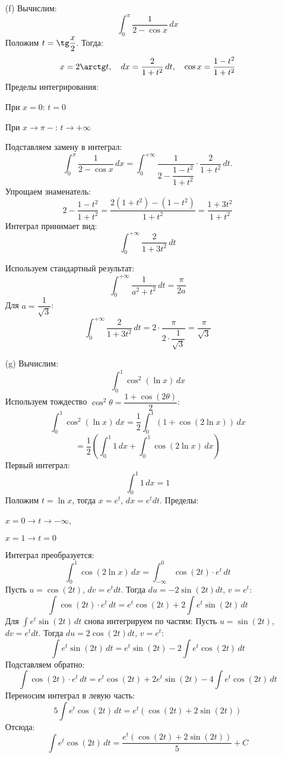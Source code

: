 \documentclass[a4paper]{article}
\begin{document}
\begin{enumerate}
\begin{enumerate}
    \item[(f)]Вычислим:
    \[
    \int_{0}^{\pi} \frac{1}{2 - \cos x} \, dx
    \]  
    Положим \(t = \tg \dfrac{x}{2}\). Тогда:  
    \[
    x = 2 \arctg t, \quad dx = \dfrac{2}{1 + t^2} \, dt,
     \quad \cos x = \dfrac{1 - t^2}{1 + t^2}
    \]  
    Пределы интегрирования:  
    
    При \(x = 0\): \(t = 0\) 
    
    При \(x \to \pi-\): \(t \to +\infty\)

    Подставляем замену в интеграл:  
    \[
    \int_{0}^{\pi} \frac{1}{2 - \cos x} \, dx = \int_{0}^{+\infty} \frac{1}{2 - \dfrac{1 - t^2}{1 + t^2}} \cdot \dfrac{2}{1 + t^2} \, dt.
    \]  
    Упрощаем знаменатель:  
    \[
    2 - \dfrac{1 - t^2}{1 + t^2} = \dfrac{2(1 + t^2) - (1 - t^2)}{1 + t^2} =
     \dfrac{1 + 3t^2}{1 + t^2}
    \]  
    Интеграл принимает вид:  
    \[
    \int_{0}^{+\infty} \dfrac{2}{1 + 3t^2} \, dt
    \]
    
    Используем стандартный результат:  
    \[
    \int_{0}^{+\infty} \dfrac{1}{a^2 + t^2} \, dt = \dfrac{\pi}{2a}
    \]  
    Для \(a = \dfrac{1}{\sqrt{3}}\):  
    \[
    \int_{0}^{+\infty} \dfrac{2}{1 + 3t^2} \, dt = 2 \cdot 
    \dfrac{\pi}{2 \cdot \dfrac{1}{\sqrt{3}}} = \dfrac{\pi}{\sqrt{3}}
    \]

    \item[(g)]Вычислим:
    \[
    \int_{0}^{1} \cos^2(\ln x) \, dx
    \] 
    Используем тождество \(\cos^2 \theta = \dfrac{1 + \cos(2\theta)}{2}\):  
    \[
    \int_{0}^{1} \cos^2(\ln x) \, dx = \dfrac{1}{2} \int_{0}^{1} 
    \left(1 + \cos(2\ln x)\right) \, dx
    \]
    \[
    = \dfrac{1}{2} \left( \int_{0}^{1} 1 \, dx + \int_{0}^{1} \cos(2\ln x) \, dx \right)
    \]
    Первый интеграл:  
    \[
    \int_{0}^{1} 1 \, dx = 1
    \]
    Положим \(t = \ln x\), тогда \(x = e^t\), \(dx = e^t dt\). Пределы:  
    
    \(x = 0 \to t \to -\infty\),  
  
    \(x = 1 \to t = 0\)
    
    Интеграл преобразуется:  
    \[
    \int_{0}^{1} \cos(2\ln x) \, dx = \int_{-\infty}^{0} \cos(2t) \cdot e^t \, dt
    \]
    Пусть \(u = \cos(2t)\), \(dv = e^t dt\). Тогда \(du = -2\sin(2t) dt\), \(v = e^t\):  
    \[
    \int \cos(2t) \cdot e^t \, dt = e^t \cos(2t) + 2 \int e^t \sin(2t) \, dt
    \]  
    Для \(\int e^t \sin(2t) \, dt\) снова интегрируем по частям:  
    Пусть \(u = \sin(2t)\), \(dv = e^t dt\). Тогда \(du = 2\cos(2t) dt\), \(v = e^t\):  
    \[
    \int e^t \sin(2t) \, dt = e^t \sin(2t) - 2 \int e^t \cos(2t) \, dt
    \]  
    Подставляем обратно:  
    \[
    \int \cos(2t) \cdot e^t \, dt = e^t \cos(2t) + 2e^t \sin(2t) - 
    4 \int e^t \cos(2t) \, dt
    \]  
    Переносим интеграл в левую часть:  
    \[
    5 \int e^t \cos(2t) \, dt = e^t \left(\cos(2t) + 2\sin(2t)\right)
    \]  
    Отсюда:  
    \[
    \int e^t \cos(2t) \, dt = \dfrac{e^t \left(\cos(2t) + 2\sin(2t)\right)}{5} + C
    \]
    

\end{enumerate}
\end{enumerate}
\end{document}
